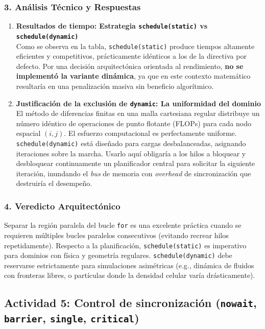 \documentclass[11pt,a4paper]{article}
\begin{document}
\subsubsection*{3. Análisis Técnico y Respuestas}

\begin{enumerate}
    \item \textbf{Resultados de tiempo: Estrategia \texttt{schedule(static)} vs \texttt{schedule(dynamic)}}\\
    Como se observa en la tabla, \texttt{schedule(static)} produce tiempos altamente eficientes y competitivos, prácticamente idénticos a los de la directiva por defecto. Por una decisión arquitectónica orientada al rendimiento, \textbf{no se implementó la variante dinámica}, ya que en este contexto matemático resultaría en una penalización masiva sin beneficio algorítmico.

    \item \textbf{Justificación de la exclusión de \texttt{dynamic}: La uniformidad del dominio}\\
    El método de diferencias finitas en una malla cartesiana regular distribuye un número idéntico de operaciones de punto flotante (FLOPs) para cada nodo espacial $(i,j)$. El esfuerzo computacional es perfectamente uniforme. \texttt{schedule(dynamic)} está diseñado para cargas desbalanceadas, asignando iteraciones sobre la marcha. Usarlo aquí obligaría a los hilos a bloquear y desbloquear continuamente un planificador central para solicitar la siguiente iteración, inundando el \textit{bus} de memoria con \textit{overhead} de sincronización que destruiría el desempeño.
\end{enumerate}

\subsubsection*{4. Veredicto Arquitectónico}
Separar la región paralela del bucle \texttt{for} es una excelente práctica cuando se requieren múltiples bucles paralelos consecutivos (evitando recrear hilos repetidamente). Respecto a la planificación, \texttt{schedule(static)} es imperativo para dominios con física y geometría regulares. \texttt{schedule(dynamic)} debe reservarse estrictamente para simulaciones asimétricas (e.g., dinámica de fluidos con fronteras libres, o partículas donde la densidad celular varía drásticamente).

\subsection*{Actividad 5: Control de sincronización (\texttt{nowait}, \texttt{barrier}, \texttt{single}, \texttt{critical})}
\end{document}
